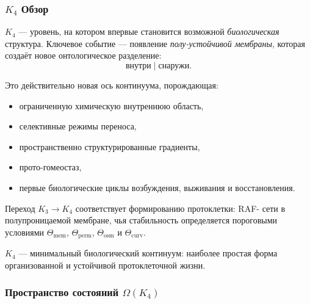 

\subsubsection{\texorpdfstring{$K_4$}{K_4} Обзор}
\label{sec:k4-overview}

$K_4$ — уровень, на котором впервые становится возможной
\emph{биологическая} структура. Ключевое событие — появление
\emph{полу-устойчивой мембраны}, которая создаёт новое онтологическое
разделение:
\[
\text{внутри} \;|\; \text{снаружи}.
\]

Это действительно новая ось континуума, порождающая:
\begin{itemize}
    \item ограниченную химическую внутреннюю область,
    \item селективные режимы переноса,
    \item пространственно структурированные градиенты,
    \item прото-гомеостаз,
    \item первые биологические циклы возбуждения, выживания и восстановления.
\end{itemize}

Переход $K_3 \to K_4$ соответствует формированию протоклетки: RAF-
сети в полупроницаемой мембране, чья стабильность определяется
пороговыми условиями $\Theta_{\mathrm{mem}}$,
$\Theta_{\mathrm{perm}}$, $\Theta_{\mathrm{osm}}$ и
$\Theta_{\mathrm{curv}}$.

$K_4$ — минимальный биологический континуум: наиболее простая форма
организованной и устойчивой протоклеточной жизни.

\subsubsection{Пространство состояний \texorpdfstring{$\Omega(K_4)$}{\Omega(K_4)}}

